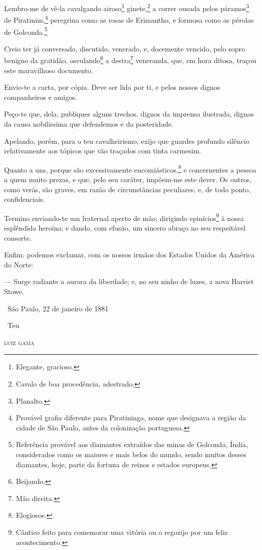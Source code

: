 {Lembro-me de vê-la cavalgando airoso\footnote{Elegante, gracioso.}
ginete,\footnote{Cavalo de boa procedência, adestrado.} a correr
ousada pelos páramos\footnote{Planalto.} de Piratinim,\footnote{
  Provável grafia diferente para Piratininga, nome que designava a
  região da cidade de São Paulo, antes da colonização portuguesa.}
peregrina como as rosas de Erimantho, e formosa como as pérolas de
Golconda.\footnote{Referência provável aos diamantes extraídos das
  minas de Golconda, Índia, considerados como os maiores e mais belos do
  mundo, sendo muitos desses diamantes, hoje, parte da fortuna de reinos
  e estados europeus.}

Creio ter já conversado, discutido, venerado, e, docemente vencido, pelo
sopro benigno da gratidão, osculando\footnote{Beijando.} a
destra\footnote{Mão direita.} veneranda, que, em hora ditosa, traçou
este maravilhoso documento.

Envio-te a carta, por cópia. Deve ser lida por ti, e pelos nossos dignos
companheiros e amigos.

Peço-te que, dela, publiques alguns trechos, dignos da imprensa
ilustrada, dignos da causa nobilíssima que defendemos e da posteridade.

Apelando, porém, para o teu cavalheirismo, exijo que guardes profundo
silêncio relativamente aos tópicos que vão traçados com tinta carmesim.

Quanto a uns, porque são excessivamente encomiásticos,\footnote{
  Elogiosos.} e concernentes a pessoa a quem muito prezas, e que, pelo
seu caráter, impõem-me este dever. Os outros, como verás, são graves, em
razão de circunstâncias peculiares, e, de todo ponto, confidenciais.

Termino enviando-te um fraternal aperto de mão; dirigindo
epinícios\footnote{Cântico feito para comemorar uma vitória ou o
  regozijo por um feliz acontecimento.} à nossa esplêndida heroína; e
dando, com efusão, um sincero abraço no seu respeitável consorte.

Enfim: podemos exclamar, com os nossos irmãos dos Estados Unidos da
América do Norte:

--- Surge radiante a aurora da liberdade; e, no seu ninho de luzes, a
nova Harriet Stowe.\medskip

\hfill\ São Paulo, 22 de janeiro de 1881

\hfill\ Teu

\hfill\textsc{luiz gama}

\asterisc

}
